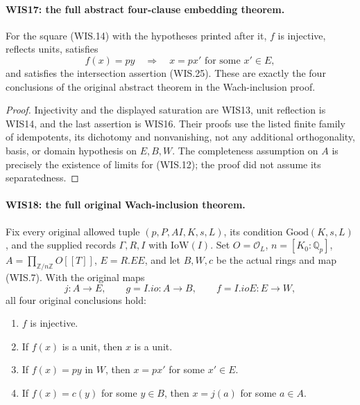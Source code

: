 \paragraph{WIS17: the full abstract four-clause embedding theorem.}
\label{claim:WIS17}
For the square (WIS.14) with the hypotheses printed after it,
$f$ is injective, reflects units, satisfies
\[
 f(x)=py\quad\Longrightarrow\quad x=px'
                                  \text{ for some }x'\in E,
\]
and satisfies the intersection assertion (WIS.25).
These are exactly the four conclusions of the original
abstract theorem in the Wach-inclusion proof.

\begin{proof}
Injectivity and the displayed saturation are WIS13,
unit reflection is WIS14, and the last assertion is WIS16.
Their proofs use the listed finite family of idempotents,
its dichotomy and nonvanishing, not any additional
orthogonality, basis, or domain hypothesis on $E,B,W$.
The completeness assumption on $A$ is precisely the
existence of limits for (WIS.12); the proof did not
assume its separatedness.
\end{proof}

\paragraph{WIS18: the full original Wach-inclusion theorem.}
\label{claim:WIS18}
Fix every original allowed tuple
$(p,P,AI,K,s,L)$, its condition $\mathrm{Good}(K,s,L)$,
and the supplied records $\Gamma,R,I$ with $\mathrm{IoW}(I)$.
Set $O=\mathcal O_L$, $n=[K_0:\mathbb Q_p]$,
$A=\prod_{\mathbb Z/n\mathbb Z}O[[T]]$, $E=R.EE$,
and let $B,W,c$ be the actual rings and map (WIS.7).
With the original maps
\[
 j:A\longrightarrow E,\qquad g=I.io:A\longrightarrow B,
                   \qquad f=I.ioE:E\longrightarrow W,
\]
all four original conclusions hold:
\begin{enumerate}
\item $f$ is injective.
\item If $f(x)$ is a unit, then $x$ is a unit.
\item If $f(x)=py$ in $W$, then $x=px'$ for some $x'\in E$.
\item If $f(x)=c(y)$ for some $y\in B$, then $x=j(a)$
      for some $a\in A$.
\end{enumerate}

